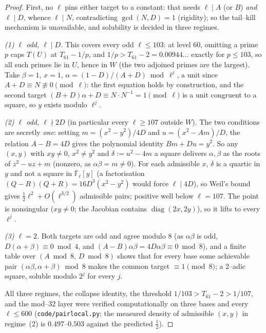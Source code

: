 \documentclass[11pt]{article}
\theoremstyle{definition}
\begin{document}
\begin{proof}
First, no $\ell$ pins either target to a constant: that needs $\ell\mid A$ (or $B$) \emph{and}
$\ell\mid D$, whence $\ell\mid N$, contradicting $\gcd(N,D)=1$ (rigidity); so the tail--kill
mechanism is unavailable, and solubility is decided in three regimes.

\emph{(1) $\ell$ odd, $\ell\mid D$.} This covers every odd $\ell\le103$: at level $60$, omitting a
prime $p$ caps $T(U)$ at $T_{61}-1/p$, and $1/p>T_{61}-2=0.00944\ldots$ exactly for $p\le103$, so
all such primes lie in $U$, hence in $W$ (the two adjoined primes are the largest). Take $\beta=1$,
$x=1$, $\alpha=(1-D)/(A+D)\bmod\ell^j$, a unit since $A+D\equiv N\not\equiv0\pmod\ell$: the first
equation holds by construction, and the second target $(B+D)\alpha+D\equiv N\cdot N^{-1}=1\pmod\ell$
is a unit congruent to a square, so $y$ exists modulo $\ell^j$.

\emph{(2) $\ell$ odd, $\ell\nmid2D$} (in particular every $\ell\ge107$ outside $W$). The two
conditions are secretly \emph{one}: setting $m=(x^2-y^2)/4D$ and $u=(x^2-Am)/D$, the relation
$A-B=4D$ gives the polynomial identity $Bm+Du=y^2$. So any $(x,y)$ with $xy\ne0$, $x^2\ne y^2$ and
$\delta:=u^2-4m$ a square delivers $\alpha,\beta$ as the roots of $z^2-uz+m$ (nonzero, as
$\alpha\beta=m\ne0$). For each admissible $x$, $\delta$ is a quartic in $y$ and not a square in
$\overline{\mathbb F}_\ell[y]$ (a factorisation $(Q-R)(Q+R)=16D^3(x^2-y^2)$ would force
$\ell\mid4D$), so Weil's bound gives $\tfrac12\ell^2+O(\ell^{3/2})$ admissible pairs; positive
well below $\ell=107$. The point is nonsingular ($xy\ne0$; the Jacobian contains
$\operatorname{diag}(2x,2y)$), so it lifts to every $\ell^j$.

\emph{(3) $\ell=2$.} Both targets are odd and agree modulo $8$ (as $\alpha\beta$ is odd,
$D(\alpha+\beta)\equiv0\bmod4$, and $(A-B)\alpha\beta=4D\alpha\beta\equiv0\bmod8$), and a finite
table over $(A\bmod8,\,D\bmod8)$ shows that for every base some achievable pair
$(\alpha\beta,\alpha+\beta)\bmod8$ makes the common target $\equiv1\pmod8$; a $2$--adic square,
soluble modulo $2^j$ for every $j$.

All three regimes, the collapse identity, the threshold $1/103>T_{61}-2>1/107$, and the mod--$32$
layer were verified computationally on three bases and every $\ell\le600$
(\texttt{code/pairlocal.py}; the measured density of admissible $(x,y)$ in regime~(2) is
$0.497$--$0.503$ against the predicted $\tfrac12$).
\end{proof}
\end{document}
